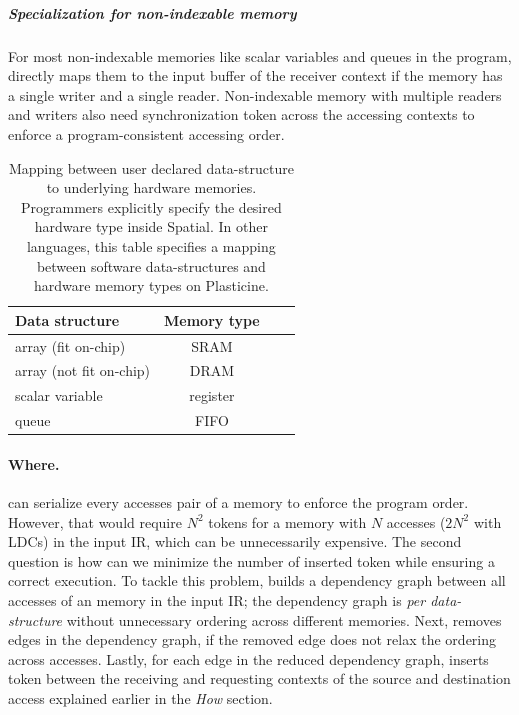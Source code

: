 \subparagraph{Specialization for non-indexable memory}
For most non-indexable memories like scalar variables and queues in the program, \name directly maps
them to the input buffer of the receiver context if the memory has a single writer and a single
reader.
Non-indexable memory with multiple readers and writers also need synchronization token across
the accessing contexts to enforce a program-consistent accessing order.

\begin{table}
  \centering
\begin{tabular}{lccc}
  \toprule
 Data structure & Memory type \\ \midrule
  array (fit on-chip) & SRAM \\
  array (not fit on-chip) & DRAM \\
  scalar variable & register \\
  queue & FIFO \\
 \bottomrule
\end{tabular}
\caption[Mapping between data-structure to hardware memories]{
  Mapping between user declared data-structure to underlying hardware memories. 
  Programmers explicitly specify the desired hardware type inside Spatial. 
  In other languages, this table specifies a mapping between software data-structures 
  and hardware memory types on Plasticine.
}
\label{tab:memtype}
\end{table}

\paragraph{Where.}
\name can serialize every accesses pair of a memory to enforce the program order. However, that
would require $N^2$ tokens for a memory with $N$ accesses ($2N^2$ with LDCs) in the input IR, which can be
unnecessarily expensive.
The second question is how can we minimize the number of inserted token while ensuring a correct execution.
To tackle this problem, \name builds a dependency graph between all accesses of an memory in the input IR; 
the dependency graph is \emph{per data-structure} without unnecessary ordering across different memories.
Next, \name removes edges in the dependency graph, if the removed edge does not relax the ordering
across accesses.
Lastly, for each edge in the reduced dependency graph, \name inserts token between the receiving and
requesting contexts of the source and destination access explained earlier in the \emph{How} section.

